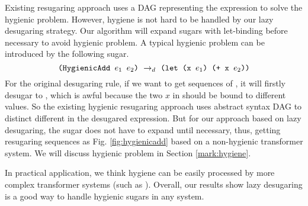 Existing resugaring approach \cite{hygienic} uses a DAG representing the expression to solve the hygienic problem. However, hygiene is not hard to be handled by our lazy desugaring strategy. Our algorithm will expand sugars with let-binding before necessary to avoid hygienic problem.
A typical hygienic problem can be introduced by the following sugar.
\[
\texttt{(HygienicAdd $e_1$ $e_2$)} ~\rightarrow_d~ \texttt{(let (x $e_1$) (+ x $e_2$))}
\]
For the original desugaring rule, if we want to get sequences of , it will firstly desugar to , which is awful because the two $x$ in  should be bound to different values. So the existing hygienic resugaring approach uses abstract syntax DAG to distinct different  in the desugared expression. But for our approach based on lazy desugaring, the  sugar does not have to expand until necessary, thus, getting resugaring sequences as Fig.  \ref{fig:hygienicadd} based on a non-hygienic transformer system. We will discuss hygienic problem in Section \ref{mark:hygiene}.



In practical application, we think hygiene can be easily processed by more complex transformer systems (such as \cite{10.5555/1792878.1792884}). Overall, our results show lazy desugaring is a good way to handle hygienic sugars in any system.

